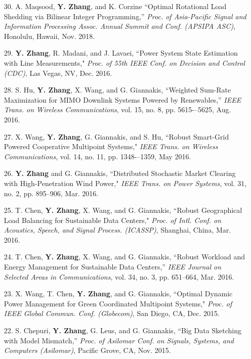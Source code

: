 \documentclass[margin,line]{res}
\begin{document}
\begin{resume}
\begin{enumerate}
\item[30.]  A. Maqsood, \textbf{Y. Zhang}, and K. Corzine
``Optimal Rotational Load Shedding via Bilinear Integer Programming,''
\emph{Proc. of Asia-Pacific Signal and Information Processing Assoc. Annual Summit and Conf. (APSIPA ASC)}, Honolulu, Hawaii, Nov. 2018.

\item[29.] \textbf{Y. Zhang}, R. Madani, and J. Lavaei,
``Power System State Estimation with Line Measurements,"
\emph{Proc. of 55th IEEE Conf. on Decision and Control (CDC)}, Las Vegas, NV, Dec. 2016.


\item[28.] S. Hu, \textbf{Y. Zhang}, X. Wang, and G. Giannakis,
``Weighted Sum-Rate Maximization for MIMO Downlink Systems Powered by Renewables,''
\emph{IEEE Trans. on Wireless Communications}, vol. 15, no. 8, pp. 5615-–5625, Aug. 2016.


\item[27.] X. Wang, \textbf{Y. Zhang}, G. Giannakis, and S. Hu,
``Robust Smart-Grid Powered Cooperative Multipoint Systems,"
\emph{IEEE Trans. on Wireless Communications}, vol. 14, no. 11, pp. 1348-–1359, May 2016.


\item[26.] \textbf{Y. Zhang} and G. Giannakis,
``Distributed Stochastic Market Clearing with High-Penetration Wind Power,"
\emph{IEEE Trans. on Power Systems}, vol. 31, no. 2, pp. 895--906, Mar. 2016.


\item[25.] T. Chen, \textbf{Y. Zhang}, X. Wang, and G. Giannakis,
``Robust Geographical Load Balancing for Sustainable Data Centers,"
\emph{Proc. of Intl. Conf. on Acoustics, Speech, and Signal Process. (ICASSP)}, Shanghai, China, Mar. 2016.

\item[24.] T. Chen, \textbf{Y. Zhang}, X. Wang, and G. Giannakis,
``Robust Workload and Energy Management for Sustainable Data Centers,''
\emph{IEEE Journal on Selected Areas in Communications}, vol. 34, no. 3, pp. 651--664, Mar. 2016.


\item[23.] X. Wang, T. Chen, \textbf{Y. Zhang}, and G. Giannakis,
``Optimal Dynamic Power Management for Green Coordinated Multipoint Systems,"
\emph{Proc. of IEEE Global Commun. Conf. (Globecom)}, San Diego, CA, Dec. 2015.

\item[22.] S. Chepuri, \textbf{Y. Zhang}, G. Leus, and G. Giannakis,
``Big Data Sketching with Model Mismatch,''
\emph{Proc. of Asilomar Conf. on Signals, Systems, and Computers (Asilomar)}, Pacific Grove, CA, Nov. 2015.



\end{enumerate}
\end{resume}
\end{document}

